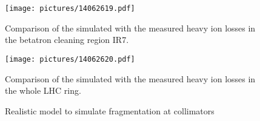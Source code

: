 







  \begin{figure}[t]
  \centering
  \texttt{[image: pictures/14062619.pdf]}
  \caption{Comparison of the simulated with the measured heavy ion losses in the betatron cleaning region IR7.}  
  \label{pic:14062610}
  \end{figure}



  \begin{figure}[t]
  \centering
  \texttt{[image: pictures/14062620.pdf]}
  \caption{Comparison of the simulated with the measured heavy ion losses in the whole LHC ring.}  
  \label{pic:14062610}
  \end{figure}


\begin{figure}[htb]
  \centering
   \def\svgwidth{1.0\linewidth}
   
  \caption{Realistic model to simulate fragmentation at collimators }
  \label{pic:14062604}
\end{figure}

